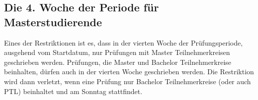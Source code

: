 \newpage
\subsection{Die 4. Woche der Periode für Masterstudierende}
Eines der Restriktionen ist es, dass in der vierten Woche der Prüfungsperiode,
ausgehend vom Startdatum, nur Prüfungen mit Master Teilnehmerkreisen geschrieben werden.
Prüfungen, die Master und Bachelor Teilnehmerkreise beinhalten, dürfen auch in der vierten Woche
geschrieben werden.
Die Restriktion wird dann verletzt, wenn eine Prüfung nur Bachelor Teilnehmerkreise (oder auch PTL) beinhaltet und am Sonntag stattfindet.

